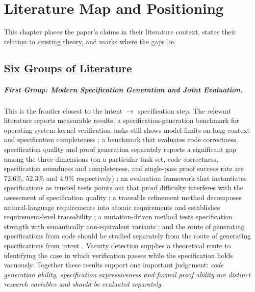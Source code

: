 \chapter{Literature Map and Positioning}\label{ch:literature}

This chapter places the paper's claims in their literature context, states their relation
to existing theory, and marks where the gaps lie.

\section{Six Groups of Literature}\label{sec:six-groups}

\paragraph{First Group: Modern Specification Generation and Joint Evaluation.}
This is the frontier closest to the intent $\to$ specification step. The relevant
literature reports measurable results: a specification-generation benchmark for
operating-system kernel verification tasks still shows model limits on long context and
specification completeness \cite{osvbench2026}; a benchmark that evaluates code
correctness, specification quality and proof generation separately reports a significant
gap among the three dimensions (on a particular task set, code correctness, specification
soundness and completeness, and single-pass proof success rate are 72.6\%, 52.3\% and
4.9\% respectively) \cite{verina2026}; an evaluation framework that instantiates
specifications as trusted tests points out that proof difficulty interferes with the
assessment of specification quality \cite{coins2026}; a traceable refinement method
decomposes natural-language requirements into atomic requirements and establishes
requirement-level traceability \cite{verispecgen2026}; a mutation-driven method tests
specification strength with semantically non-equivalent variants \cite{specsyn2026}; and
the route of generating specifications from code should be studied separately from the
route of generating specifications from intent \cite{specgen2025}. Vacuity detection
\cite{kupferman2003} supplies a theoretical route to identifying the case in which
verification passes while the specification holds vacuously. Together these results support
one important judgement: \emph{code generation ability, specification expressiveness and
formal proof ability are distinct research variables and should be evaluated separately}.

